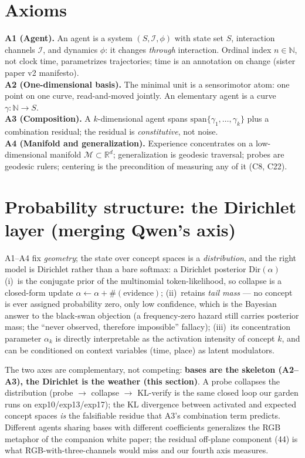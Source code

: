 \documentclass[11pt]{article}
\newcommand{\R}{\mathbb{R}}
\begin{document}
\section{Axioms}
\textbf{A1 (Agent).} An agent is a system $(S,\mathcal{I},\phi)$ with state set $S$,
interaction channels $\mathcal{I}$, and dynamics $\phi$: it changes \emph{through} interaction.
Ordinal index $n\in\mathbb{N}$, not clock time, parametrizes trajectories; time is an
annotation on change (sister paper v2 manifesto).\\
\textbf{A2 (One-dimensional basis).} The minimal unit is a sensorimotor atom: one point
on one curve, read-and-moved jointly. An elementary agent is a curve $\gamma:\mathbb{N}\to S$.\\
\textbf{A3 (Composition).} A $k$-dimensional agent spans $\mathrm{span}\{\gamma_1,\dots,\gamma_k\}$
plus a combination residual; the residual is \emph{constitutive}, not noise.\\
\textbf{A4 (Manifold and generalization).} Experience concentrates on a low-dimensional
manifold $\mathcal{M}\subset\R^d$; generalization is geodesic traversal; probes are
geodesic rulers; centering is the precondition of measuring any of it (C8, C22).

\section{Probability structure: the Dirichlet layer (merging Qwen's axis)}
A1--A4 fix \emph{geometry}; the state over concept spaces is a \emph{distribution}, and the
right model is Dirichlet rather than a bare softmax: a Dirichlet posterior $\mathrm{Dir}(\alpha)$
(i)\ is the conjugate prior of the multinomial token-likelihood, so collapse is a closed-form
update $\alpha\!\leftarrow\!\alpha+\#(\text{evidence})$; (ii)\ retains \emph{tail mass} ---
no concept is ever assigned probability zero, only low confidence, which is the Bayesian
answer to the black-swan objection (a frequency-zero hazard still carries posterior mass;
the ``never observed, therefore impossible'' fallacy); (iii)\ its concentration parameter
$\alpha_k$ is directly interpretable as the activation intensity of concept $k$, and can be
conditioned on context variables (time, place) as latent modulators.

The two axes are complementary, not competing: \textbf{bases are the skeleton (A2--A3),
the Dirichlet is the weather (this section)}. A probe collapses the distribution
(probe $\to$ collapse $\to$ KL-verify is the same closed loop our garden runs on
exp10/exp13/exp17); the KL divergence between activated and expected concept spaces
\emph{is} the falsifiable residue that A3's combination term predicts. Different agents
sharing bases with different coefficients generalizes the RGB metaphor of the companion
white paper; the residual off-plane component (44\textdegree) is what RGB-with-three-channels
would miss and our fourth axis measures.
\end{document}
